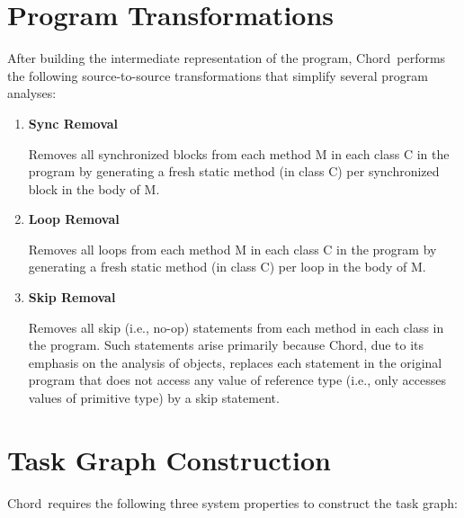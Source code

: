 \documentclass{article}
\providecommand\Chord{{Chord}}
\begin{document}
\texonly{\newpage}
\section{Program Transformations}
\label{sec-prog-transform}

After building the intermediate representation of the
program, \Chord\ performs
the following source-to-source transformations 
that simplify several program analyses:

\begin{enumerate}
\item
{\bf Sync Removal}

Removes all synchronized blocks from each method M in each class
C in the program by generating a fresh static method (in class C)
per synchronized block in the body of M.

\item
{\bf Loop Removal}

Removes all loops from each method M in each class C in the program
by generating a fresh static method (in class C)
per loop in the body of M.

\item
{\bf Skip Removal}

Removes all skip (i.e., no-op) statements from each method in each class
in the program.
Such statements arise primarily because \Chord, due to its emphasis
on the analysis of objects, replaces each
statement in the original program that does not access any
value of reference type (i.e., only accesses values of primitive
type) by a skip statement.

\end{enumerate}

\texonly{\newpage}
\section{Task Graph Construction}
\label{sec-tg}

\Chord\ requires the following three system properties to construct the task graph:
\end{document}
